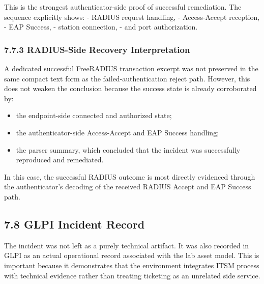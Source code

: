 \documentclass[11pt]{article}
\begin{document}
This is the strongest authenticator-side proof of successful remediation. The sequence explicitly shows:
- RADIUS request handling,
- Access-Accept reception,
- EAP Success,
- station connection,
- and port authorization.

\subsubsection{7.7.3 RADIUS-Side Recovery Interpretation}
\label{sec:radius-side-recovery-interpretation}

A dedicated successful FreeRADIUS transaction excerpt was not preserved in the same compact text form as the failed-authentication reject path. However, this does not weaken the conclusion because the success state is already corroborated by:

\begin{itemize}
    \item the endpoint-side connected and authorized state;
    \item the authenticator-side Access-Accept and EAP Success handling;
    \item the parser summary, which concluded that the incident was successfully reproduced and remediated.
\end{itemize}

In this case, the successful RADIUS outcome is most directly evidenced through the authenticator's decoding of the received RADIUS Accept and EAP Success path.


\subsection{7.8 GLPI Incident Record}
\label{sec:glpi-incident-record}

The incident was not left as a purely technical artifact. It was also recorded in GLPI as an actual operational record associated with the lab asset model. This is important because it demonstrates that the environment integrates ITSM process with technical evidence rather than treating ticketing as an unrelated side service.
\end{document}
